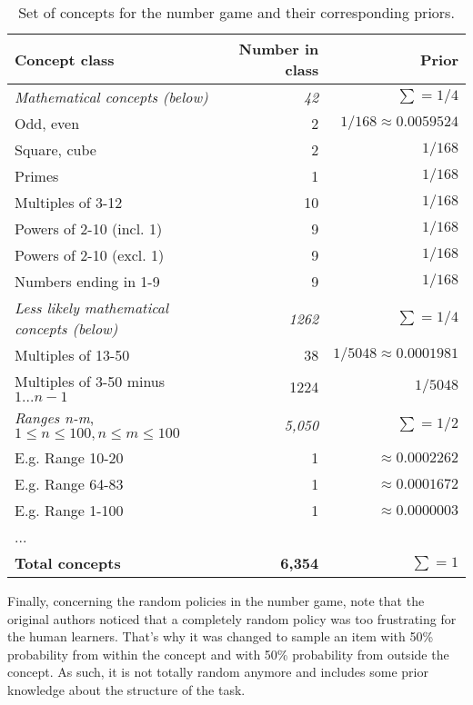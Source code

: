 \begin{table}
\centering
\small
\begin{tabular}{l|r|r}
    \hline
    \textbf{Concept class}  & \textbf{Number in class} & \textbf{Prior} \\
    \hline
    \textit{Mathematical concepts (below)} & \textit{42} & $\sum = 1/4$ \\
    \hline
    Odd, even               & 2     & $1/168 \approx 0.0059524$ \\
    Square, cube            & 2     & $1/168$ \\
    Primes                  & 1     & $1/168$ \\
    Multiples of 3-12       & 10    & $1/168$ \\
    Powers of 2-10 (incl. 1)& 9     & $1/168$ \\
    Powers of 2-10 (excl. 1)& 9     & $1/168$ \\
    Numbers ending in 1-9   & 9     & $1/168$ \\
    \hline\hline
    \textit{Less likely mathematical concepts (below)} & \textit{1262} & $\sum = 1/4$ \\
    \hline
    Multiples of 13-50        & 38 & $1/5048 \approx 0.0001981$ \\
    Multiples of 3-50 minus $1...n-1$ & 1224 & $1/5048$ \\
    \hline\hline
    \textit{Ranges n-m}, $1 \leq n \leq 100, n \leq m \leq 100$ & \textit{5,050} & $\sum = 1/2$ \\
    \hline
    E.g. Range 10-20        & 1 & $\approx0.0002262$ \\
    E.g. Range 64-83        & 1 & $\approx0.0001672$ \\
    E.g. Range 1-100        & 1 & $\approx0.0000003$ \\
    ... & &                     \\
    \hline\hline
    \textbf{Total concepts} & \textbf{6,354} & $\sum = 1$ \\
    \hline
\end{tabular}
\caption{Set of concepts for the number game and their corresponding priors.}
\label{tab:ng-concepts}
\end{table}

Finally, concerning the random policies in the number game, note that the original authors noticed that a completely random policy was too frustrating for the human learners. That's why it was changed to sample an item with 50\% probability from within the concept and with 50\% probability from outside the concept.
As such, it is not totally random anymore and includes some prior knowledge about the structure of the task.

